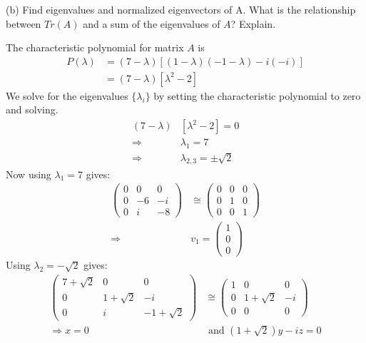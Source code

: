 \documentclass[a4paper, 11pt]{article}
\newenvironment{solution}{%
	\begin{list}{}{%
			\setlength{\topsep}{0pt}%
			\setlength{\leftmargin}{1.5cm}%
			\setlength{\rightmargin}{1.5cm}%
			\setlength{\listparindent}{\parindent}%
			\setlength{\itemindent}{\parindent}%
			\setlength{\parsep}{\parskip}%
	}%
	\item[]}{\end{list}}
\begin{document}
\noindent(b) Find eigenvalues and normalized eigenvectors of A. What is the relationship between $Tr(A)$ and a sum of the eigenvalues of $A$? Explain. \\
	\begin{solution}
		\noindent The characteristic polynomial for matrix $A$ is 
			\begin{align*}
				P(\lambda) &= (7-\lambda)[(1-\lambda)(-1-\lambda)-i(-i)] \\ 
					&= (7-\lambda)[\lambda^2 -2]
			\end{align*}
		We solve for the eigenvalues $\{\lambda_i\}$ by setting the characteristic polynomial to zero and solving. 
			\begin{align*}
				(7-\lambda)&[\lambda^2 -2] = 0 \\ 
				\Rightarrow& \lambda_1 = 7 \\ 
				\Rightarrow& \lambda_{2,3} = \pm \sqrt{2} 
			\end{align*}
		Now using $\lambda_1 = 7$ gives:
			\begin{align*}
				\begin{pmatrix} 0 & 0 & 0 \\ 0 & -6 & -i \\ 0 & i & -8\end{pmatrix} &\cong \begin{pmatrix} 0 & 0 & 0 \\ 0 & 1 & 0 \\ 0 & 0 & 1\end{pmatrix} \\ 
				\Rightarrow& \mathit{v}_1 = \begin{pmatrix}1 \\ 0 \\ 0 \end{pmatrix}
			\end{align*}
		Using $\lambda_2 = -\sqrt{2}$ gives: 
			\begin{align*}
				\begin{pmatrix}7+\sqrt{2} & 0 & 0 \\ 0 & 1+\sqrt{2} & -i \\ 0 & i & -1+\sqrt{2}\end{pmatrix} &\cong \begin{pmatrix} 1 & 0 & 0 \\ 0 & 1+\sqrt{2} & -i \\ 0 & 0 & 0  \end{pmatrix} \\ 
				\Rightarrow x=0 &\text{ and } (1+\sqrt{2})y-iz = 0 \\ 

\end{align*}
\end{solution}
\end{document}
